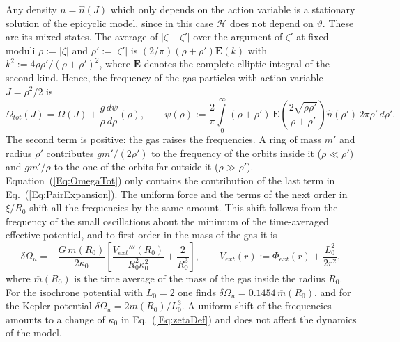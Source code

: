 Any density $n = \hat{n}(J)$ which only depends on the action variable is a stationary solution of the epicyclic model, since in this case $\mathcal{H}$ does not depend on $\vartheta$. These are its mixed states. The average of $|\zeta - \zeta'|$ over the argument of $\zeta'$ at fixed moduli $\rho := |\zeta|$ and $\rho' := |\zeta'|$ is $(2/\pi)(\rho + \rho')\mathbf{E}(k)$ with $k^2 := 4\rho\rho'/(\rho + \rho')^2$, where $\mathbf{E}$ denotes the complete elliptic integral of the second kind. Hence, the frequency of the gas particles with action variable $J = \rho^2/2$ is
\begin{equation}
\Omega_{tot}(J) = \Omega(J) + \frac{g}{\rho}\frac{d\psi}{d\rho}(\rho),\qquad
\psi(\rho) := \frac{2}{\pi}\int\limits_0^\infty (\rho + \rho')\,\mathbf{E}\left( \frac{2\sqrt{\rho\rho'}}{\rho + \rho'} \right) \hat{n}(\rho')\, 2\pi\rho'\, d\rho'.
\label{Eq:OmegaTot}
\end{equation}
The second term is positive: the gas raises the frequencies. A ring of mass $m'$ and radius $\rho'$ contributes $g m'/(2\rho')$ to the frequency of the orbits inside it ($\rho\ll\rho'$) and $g m'/\rho$ to the one of the orbits far outside it ($\rho\gg\rho'$). Equation~(\ref{Eq:OmegaTot}) only contains the contribution of the last term in Eq.~(\ref{Eq:PairExpansion}). The uniform force and the terms of the next order in $\xi/R_0$ shift all the frequencies by the same amount. This shift follows from the frequency of the small oscillations about the minimum of the time-averaged effective potential, and to first order in the mass of the gas it is
\begin{equation}
\delta\Omega_u = -\frac{G\,\overline{m}(R_0)}{2\kappa_0}\left[ \frac{V_{ext}'''(R_0)}{R_0^2\kappa_0^2} + \frac{2}{R_0^3} \right],\qquad
V_{ext}(r) := \Phi_{ext}(r) + \frac{L_0^2}{2r^2},
\label{Eq:UniformShift}
\end{equation}
where $\overline{m}(R_0)$ is the time average of the mass of the gas inside the radius $R_0$. For the isochrone potential with $L_0 = 2$ one finds $\delta\Omega_u = 0.1454\,\overline{m}(R_0)$, and for the Kepler potential $\delta\Omega_u = 2\overline{m}(R_0)/L_0^3$. A uniform shift of the frequencies amounts to a change of $\kappa_0$ in Eq.~(\ref{Eq:zetaDef}) and does not affect the dynamics of the model.

